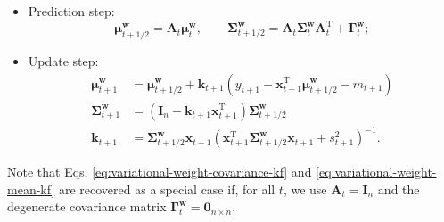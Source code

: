 \begin{itemize}
	\item Prediction step:
	\begin{equation}
		\boldsymbol{\mu}_{t+1/2}^\mathbf{w}
		= \mathbf{A}_{t}\boldsymbol{\mu}_{t}^\mathbf{w},
		\qquad
		\boldsymbol{\Sigma}_{t+1/2}^\mathbf{w}
		= \mathbf{A}_{t}\boldsymbol{\Sigma}_{t}^\mathbf{w}\mathbf{A}_{t}^\text{T} + \mathbf{\Gamma}_t^\mathbf{w};
	\end{equation}
	\item Update step:
	\begin{align}
		\boldsymbol{\mu}_{t+1}^\mathbf{w}
		&= \boldsymbol{\mu}_{t+1/2}^\mathbf{w} + \mathbf{k}_{t+1}(y_{t+1} - \mathbf{x}_{t+1}^\text{T}\boldsymbol{\mu}_{t+1/2}^\mathbf{w} - m_{t+1})
		\\
		\boldsymbol{\Sigma}_{t+1}^\mathbf{w}
		&= (\mathbf{I}_n - \mathbf{k}_{t+1}\mathbf{x}_{t+1}^\text{T})\boldsymbol{\Sigma}_{t+1/2}^\mathbf{w}
		\\
		\mathbf{k}_{t+1}
		&= \boldsymbol{\Sigma}_{t+1/2}^\mathbf{w}\mathbf{x}_{t+1}(\mathbf{x}_{t+1}^\text{T}\boldsymbol{\Sigma}_{t+1/2}^\mathbf{w}\mathbf{x}_{t+1} + s_{t+1}^2)^{-1}.
	\end{align}
\end{itemize}
Note that Eqs. \eqref{eq:variational-weight-covariance-kf} and \eqref{eq:variational-weight-mean-kf} are recovered as a special case if, for all $t$, we use $\mathbf{A}_t = \mathbf{I}_n$ and the degenerate covariance matrix $\mathbf{\Gamma}_t^\mathbf{w} = \mathbf{0}_{n\times n}$.


